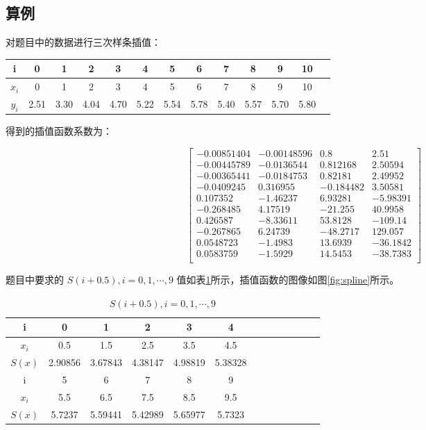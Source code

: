 \subsection{算例}

对题目中的数据进行三次样条插值：

\begin{table}[ht]\centering
    \begin{tabular}{c|cccccccccccc}
        i & 0 & 1 & 2 & 3 & 4 & 5 & 6 & 7 & 8 & 9 & 10\\
        \hline
        $x_i$ & 0 & 1 & 2 & 3 & 4 & 5 & 6 & 7 & 8 & 9 & 10\\
        $y_i$ & 2.51 & 3.30 & 4.04 & 4.70 & 5.22 & 5.54 & 5.78 & 5.40 & 5.57 & 5.70 & 5.80 
    \end{tabular}
\end{table}

得到的插值函数系数为：

$$
\begin{bmatrix}
    -0.00851404 & -0.00148596 & 0.8 & 2.51 \\
    -0.00445789 & -0.0136544 & 0.812168 & 2.50594 \\
    -0.00365441 & -0.0184753 & 0.82181 & 2.49952 \\
    -0.0409245 & 0.316955 & -0.184482 & 3.50581 \\
    0.107352 & -1.46237 & 6.93281 & -5.98391 \\
    -0.268485 & 4.17519 & -21.255 & 40.9958 \\
    0.426587 & -8.33611 & 53.8128 & -109.14 \\
    -0.267865 & 6.24739 & -48.2717 & 129.057 \\
    0.0548723 & -1.4983 & 13.6939 & -36.1842 \\
    0.0583759 & -1.5929 & 14.5453 & -38.7383 \\
\end{bmatrix}
$$

题目中要求的 $S(i+0.5),i=0,1,\cdots,9$ 值如表\ref{tab:Si}所示，插值函数的图像如图\ref{fig:spline}所示。

\begin{table}[ht]\centering
\caption{$S(i+0.5),i=0,1,\cdots,9$}
\label{tab:Si}
    \begin{tabular}{c|cccccccccccc}
        i & 0 & 1 & 2 & 3 & 4 \\
        \hline
        $x_i$ & 0.5 & 1.5 & 2.5 & 3.5 & 4.5 \\
        $S(x)$ & 2.90856 & 3.67843 & 4.38147 & 4.98819 & 5.38328 \\
        \hline\hline
        i & 5 & 6 & 7 & 8 & 9 \\
        \hline
        $x_i$ & 5.5 & 6.5 & 7.5 & 8.5 & 9.5\\
        $S(x)$ & 5.7237 & 5.59441 & 5.42989 & 5.65977 & 5.7323 
    \end{tabular}
\end{table}

